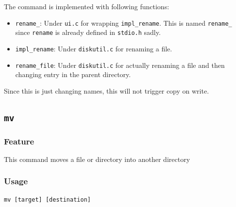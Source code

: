 \documentclass{homework}
\begin{document}
The command is implemented with following functions:
\begin{itemize}
    \item \texttt{rename_}: Under \texttt{ui.c} for wrapping \texttt{impl_rename}. This is named \texttt{rename_} since \texttt{rename} is already defined in \texttt{stdio.h} sadly.
    \item \texttt{impl_rename}: Under \texttt{diskutil.c} for renaming a file.
    \item \texttt{rename_file}: Under \texttt{diskutil.c} for actually renaming a file and then changing entry in the parent directory.
\end{itemize}
Since this is just changing names, this will not trigger copy on write.
\pagebreak

\subsection{\texttt{mv}}
\subsubsection{Feature}
This command moves a file or directory into another directory
\subsubsection{Usage}
\begin{center}
\texttt{mv [target] [destination]}
\end{center}
\end{document}
